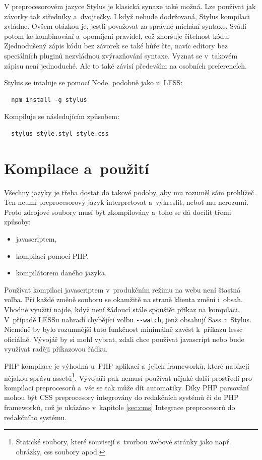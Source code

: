 \documentclass[thesis=B,czech]{FITthesis}[2012/06/26]
\begin{document}
V preprocesorovém jazyce Stylus je klasická synaxe také možná. Lze používat jak závorky tak středníky a~dvojtečky. I když nebude dodržovaná, Stylus kompilaci zvládne. Ovšem otázkou je, jestli považovat za správné míchání syntaxe. Svádí potom ke kombinování a~opomíjení pravidel, což zhoršuje čitelnost kódu. Zjednodušený zápis kódu bez závorek se také hůře čte, navíc editory bez speciálních pluginů nezvládnou zvýrazňování syntaxe. Vyznat se v~takovém zápisu není jednoduché. Ale to také závisí především na osobních preferencích.

Stylus se intaluje se pomocí Node, podobně jako u~LESS:
\scriptsize
\begin{verbatim}
  npm install -g stylus
\end{verbatim}
\normalsize
Kompiluje se následujícím způsobem:
\scriptsize
\begin{verbatim}
  stylus style.styl style.css
\end{verbatim}
\normalsize


\section{Kompilace a~použití}
\label{sec:comp}


Všechny jazyky je třeba dostat do takové podoby, aby mu rozuměl sám prohlížeč. Ten neumí  preprocesorový jazyk interpretovat a~vykreslit, neboť mu nerozumí. Proto zdrojové soubory musí být zkompilovány a~toho se dá docílit třemi způsoby:


\begin{itemize}
 \item javascriptem,
 \item kompilací pomocí \gls{PHP},
 \item kompilátorem daného jazyka.
\end{itemize}

Používat kompilaci javascriptem v~produkčním režimu na webu není štastná volba. Při každé změně souboru se okamžitě na straně klienta změní i~obsah. Vhodné využití najde, když není žádoucí stále spouštět příkaz na kompilaci. V~případě LESSu nahradí chybějící volbu \verb#--watch#, jenž obsahují \gls{Sass} a~Stylus. Nicméně by bylo rozumnější tuto funkčnost minimálně zavést k~příkazu lessc oficiálně. Vývojář by si mohl vybrat, zdali chce používat javascript nebo bude využívat raději příkazovou řádku. 

\gls{PHP} kompilace je výhodná u~\gls{PHP} aplikací a~jejich frameworků, které nabízejí nějakou správu assetů\footnote{Statické soubory, které souvisejí s~tvorbou webové stránky jako např. obrázky, css soubory apod.}. Vývojáři pak nemusí používat nějaké další prostředí pro kompilaci preprocesorů a~vše se tak může dít automatiky. Díky \gls{PHP} parsování mohou být \gls{CSS} preprocesory integrovány do redakčních systémů či do \gls{PHP} frameworků, což je ukázáno v~kapitole \ref{sec:cms} Integrace preprocesorů do redakčního systému. 
\end{document}
